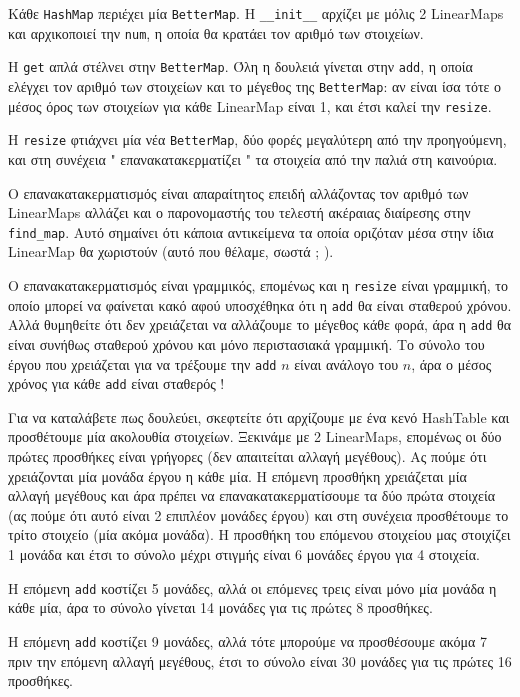 \documentclass[10pt]{book}
\begin{document}
 Κάθε  {\tt HashMap}  περιέχει μία  {\tt BetterMap}.   Η  
\verb"__init__"  αρχίζει με μόλις 2  LinearMaps  και αρχικοποιεί την  
{\tt num},  η οποία θα κρατάει τον αριθμό των στοιχείων.

Η  {\tt get}  απλά στέλνει στην  {\tt BetterMap}.   Όλη η δουλειά γίνεται στην  {\tt add},  η οποία ελέγχει τον αριθμό των στοιχείων και το 
μέγεθος της  {\tt BetterMap}:  αν είναι ίσα τότε ο μέσος όρος των στοιχείων 
για κάθε  LinearMap  είναι 1, και έτσι καλεί την  {\tt resize}.

 Η  {\tt resize}  φτιάχνει μία νέα  {\tt BetterMap},  δύο φορές μεγαλύτερη από την προηγούμενη, και στη συνέχεια  " επανακατακερματίζει "  τα στοιχεία από την παλιά στη καινούρια.

Ο επανακατακερματισμός είναι απαραίτητος επειδή αλλάζοντας τον αριθμό των  LinearMaps  αλλάζει και ο παρονομαστής του τελεστή ακέραιας διαίρεσης στην  
\verb"find_map".   Αυτό σημαίνει ότι κάποια αντικείμενα τα οποία οριζόταν μέσα στην ίδια  LinearMap  θα χωριστούν (αυτό που θέλαμε, σωστά ; ).

Ο επανακατακερματισμός είναι γραμμικός, επομένως και η {\tt resize} είναι 
γραμμική, το οποίο μπορεί να φαίνεται κακό αφού υποσχέθηκα ότι η  {\tt add}  
θα είναι σταθερού χρόνου.  Αλλά θυμηθείτε ότι δεν χρειάζεται να αλλάζουμε το μέγεθος κάθε φορά, άρα η  {\tt add}  θα είναι συνήθως σταθερού χρόνου και μόνο περιστασιακά γραμμική.  Το σύνολο του έργου που χρειάζεται για να τρέξουμε 
την  {\tt add}  $n$ είναι ανάλογο του $n$, άρα ο μέσος χρόνος για κάθε  
{\tt add}  είναι σταθερός !

Για να καταλάβετε πως δουλεύει, σκεφτείτε ότι αρχίζουμε με ένα κενό  
HashTable  και προσθέτουμε μία ακολουθία στοιχείων.  Ξεκινάμε με 2  LinearMaps,  επομένως οι δύο πρώτες προσθήκες είναι γρήγορες (δεν απαιτείται αλλαγή μεγέθους).  Ας πούμε ότι χρειάζονται μία μονάδα έργου η κάθε μία.  Η επόμενη προσθήκη χρειάζεται μία αλλαγή μεγέθους και άρα πρέπει να επανακατακερματίσουμε τα δύο πρώτα στοιχεία (ας πούμε ότι αυτό είναι 2 επιπλέον μονάδες έργου) και στη συνέχεια προσθέτουμε το τρίτο στοιχείο (μία ακόμα μονάδα).  Η προσθήκη του επόμενου στοιχείου μας στοιχίζει 1 μονάδα και έτσι το σύνολο μέχρι στιγμής είναι 6 μονάδες έργου για 4 στοιχεία.

Η επόμενη  {\tt add}  κοστίζει 5 μονάδες, αλλά οι επόμενες τρεις είναι μόνο μία μονάδα η κάθε μία, άρα το σύνολο γίνεται 14 μονάδες για τις πρώτες 8 προσθήκες.

Η επόμενη  {\tt add}  κοστίζει 9 μονάδες, αλλά τότε μπορούμε να προσθέσουμε ακόμα 7 πριν την επόμενη αλλαγή μεγέθους, έτσι το σύνολο είναι 30 μονάδες για τις πρώτες 16 προσθήκες.
\end{document}
